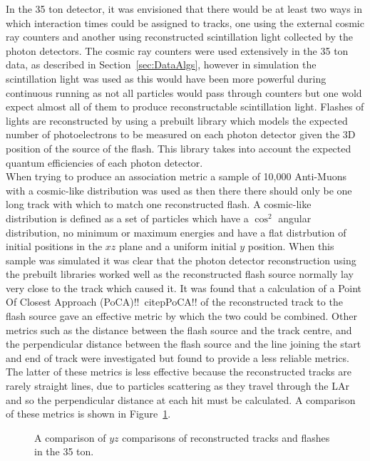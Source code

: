 In the 35 ton detector, it was envisioned that there would be at least two ways in which interaction times could be assigned to tracks, one using the external cosmic ray counters and another using reconstructed scintillation light collected by the photon detectors. The cosmic ray counters were used extensively in the 35 ton data, as described in Section~\ref{sec:DataAlgs}, however in simulation the scintillation light was used as this would have been more powerful during continuous running as not all particles would pass through counters but one wold expect almost all of them to produce reconstructable scintillation light. Flashes of lights are reconstructed by using a prebuilt library which models the expected number of photoelectrons to be measured on each photon detector given the 3D position of the source of the flash. This library takes into account the expected quantum efficiencies of each photon detector. \\

When trying to produce an association metric a sample of 10,000 Anti-Muons with a cosmic-like distribution was used as then there there should only be one long track with which to match one reconstructed flash. A cosmic-like distribution is defined as a set of particles which have a $\cos^{2}$ angular distribution, no minimum or maximum energies and have a flat distrbution of initial positions in the $xz$ plane and a uniform initial $y$ position. When this sample was simulated it was clear that the photon detector reconstruction using the prebuilt libraries worked well as the reconstructed flash source normally lay very close to the track which caused it. It was found that a calculation of a Point Of Closest Approach (PoCA)!!~citep{PoCA}!! of the reconstructed track to the flash source gave an effective metric by which the two could be combined. Other metrics such as the distance between the flash source and the track centre, and the perpendicular distance between the flash source and the line joining the start and end of track were investigated but found to provide a less reliable metrics. The latter of these metrics is less effective because the reconstructed tracks are rarely straight lines, due to particles scattering as they travel through the LAr and so the perpendicular distance at each hit must be calculated. A comparison of these metrics is shown in Figure~\ref{fig:PDYZDist}. \\

\begin{figure}[h!]
  \centering
  \caption[Matching tracks and flashes in the 35 ton using positions in the $yz$ plane]
          {A comparison of $yz$ comparisons of reconstructed tracks and flashes in the 35 ton.}
  \label{fig:PDYZDist}
\end{figure}


